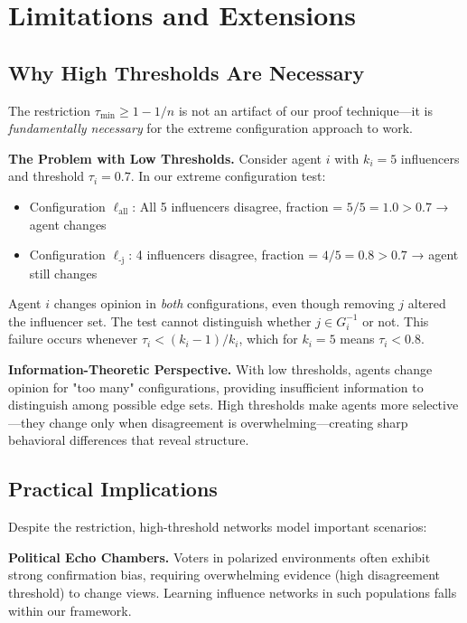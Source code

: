 \documentclass[conference]{IEEEtran}
\begin{document}
\section{Limitations and Extensions}
\label{sec:limitations}

\subsection{Why High Thresholds Are Necessary}

The restriction $\tau_{\min} \geq 1 - 1/n$ is not an artifact of our proof technique—it is \emph{fundamentally necessary} for the extreme configuration approach to work.

\textbf{The Problem with Low Thresholds.} Consider agent $i$ with $k_i = 5$ influencers and threshold $\tau_i = 0.7$. In our extreme configuration test:
\begin{itemize}
\item Configuration $\ell_{\text{all}}$: All 5 influencers disagree, fraction = $5/5 = 1.0 > 0.7$ → agent changes
\item Configuration $\ell_{\text{-j}}$: 4 influencers disagree, fraction = $4/5 = 0.8 > 0.7$ → agent still changes
\end{itemize}

Agent $i$ changes opinion in \emph{both} configurations, even though removing $j$ altered the influencer set. The test cannot distinguish whether $j \in G^{-1}_i$ or not. This failure occurs whenever $\tau_i < (k_i - 1)/k_i$, which for $k_i = 5$ means $\tau_i < 0.8$.

\textbf{Information-Theoretic Perspective.} With low thresholds, agents change opinion for "too many" configurations, providing insufficient information to distinguish among possible edge sets. High thresholds make agents more selective—they change only when disagreement is overwhelming—creating sharp behavioral differences that reveal structure.

\subsection{Practical Implications}

Despite the restriction, high-threshold networks model important scenarios:

\textbf{Political Echo Chambers.} Voters in polarized environments often exhibit strong confirmation bias, requiring overwhelming evidence (high disagreement threshold) to change views. Learning influence networks in such populations falls within our framework.
\end{document}
